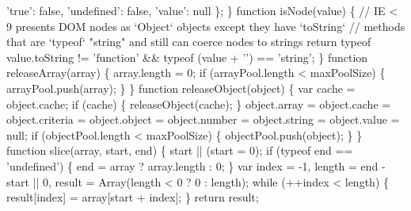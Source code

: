 \begin{DoxyCodeInclude}
\textcolor{stringliteral}{      '}\textcolor{keyword}{true}\textcolor{stringliteral}{': false,}
\textcolor{stringliteral}{      '}undefined\textcolor{stringliteral}{': false,}
\textcolor{stringliteral}{      '}value\textcolor{stringliteral}{': null}
\textcolor{stringliteral}{    \};}
\textcolor{stringliteral}{  \}}
\textcolor{stringliteral}{}
\textcolor{stringliteral}{  function isNode(value) \{}
\textcolor{stringliteral}{    // IE < 9 presents DOM nodes as `Object` objects except they have `toString`}
\textcolor{stringliteral}{    // methods that are `typeof` "string" and still can coerce nodes to strings}
\textcolor{stringliteral}{    return typeof value.toString != '}\textcolor{keyword}{function}\textcolor{stringliteral}{' && typeof (value + '}\textcolor{stringliteral}{') == '}\textcolor{keywordtype}{string}\textcolor{stringliteral}{';}
\textcolor{stringliteral}{  \}}
\textcolor{stringliteral}{}
\textcolor{stringliteral}{  function releaseArray(array) \{}
\textcolor{stringliteral}{    array.length = 0;}
\textcolor{stringliteral}{    if (arrayPool.length < maxPoolSize) \{}
\textcolor{stringliteral}{      arrayPool.push(array);}
\textcolor{stringliteral}{    \}}
\textcolor{stringliteral}{  \}}
\textcolor{stringliteral}{}
\textcolor{stringliteral}{  function releaseObject(object) \{}
\textcolor{stringliteral}{    var cache = object.cache;}
\textcolor{stringliteral}{    if (cache) \{}
\textcolor{stringliteral}{      releaseObject(cache);}
\textcolor{stringliteral}{    \}}
\textcolor{stringliteral}{    object.array = object.cache = object.criteria = object.object = object.number = object.string =
       object.value = null;}
\textcolor{stringliteral}{    if (objectPool.length < maxPoolSize) \{}
\textcolor{stringliteral}{      objectPool.push(object);}
\textcolor{stringliteral}{    \}}
\textcolor{stringliteral}{  \}}
\textcolor{stringliteral}{}
\textcolor{stringliteral}{  function slice(array, start, end) \{}
\textcolor{stringliteral}{    start || (start = 0);}
\textcolor{stringliteral}{    if (typeof end == '}undefined\textcolor{stringliteral}{') \{}
\textcolor{stringliteral}{      end = array ? array.length : 0;}
\textcolor{stringliteral}{    \}}
\textcolor{stringliteral}{    var index = -1,}
\textcolor{stringliteral}{        length = end - start || 0,}
\textcolor{stringliteral}{        result = Array(length < 0 ? 0 : length);}
\textcolor{stringliteral}{}
\textcolor{stringliteral}{    while (++index < length) \{}
\textcolor{stringliteral}{      result[index] = array[start + index];}
\textcolor{stringliteral}{    \}}
\textcolor{stringliteral}{    return result;}

\end{DoxyCodeInclude}
